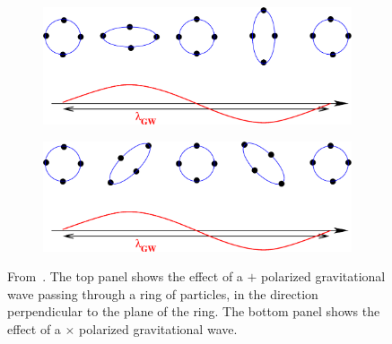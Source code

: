 \begin{figure}[!t]
\centering
\begin{subfigure}{.80\textwidth}
  \centering
  \includegraphics[width=.95\linewidth]{intro/GW1}
\end{subfigure}
\begin{subfigure}{.80\textwidth}
  \centering
  \includegraphics[width=.95\linewidth]{intro/GW2}
\end{subfigure}
\caption[Effect of $+$ and $\times$ polarized gravitational waves on a ring of particles.]{From~\cite{Buonanno:2007yg}. The top panel shows the effect of a $+$ polarized gravitational wave passing through a ring of particles, in the direction perpendicular to the plane of the ring. The bottom panel shows the effect of a $\times$ polarized gravitational wave.}
\label{fig:GWRing}
\end{figure}

